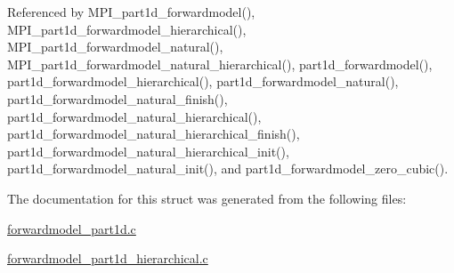 Referenced by M\+P\+I\+\_\+part1d\+\_\+forwardmodel(), M\+P\+I\+\_\+part1d\+\_\+forwardmodel\+\_\+hierarchical(), M\+P\+I\+\_\+part1d\+\_\+forwardmodel\+\_\+natural(), M\+P\+I\+\_\+part1d\+\_\+forwardmodel\+\_\+natural\+\_\+hierarchical(), part1d\+\_\+forwardmodel(), part1d\+\_\+forwardmodel\+\_\+hierarchical(), part1d\+\_\+forwardmodel\+\_\+natural(), part1d\+\_\+forwardmodel\+\_\+natural\+\_\+finish(), part1d\+\_\+forwardmodel\+\_\+natural\+\_\+hierarchical(), part1d\+\_\+forwardmodel\+\_\+natural\+\_\+hierarchical\+\_\+finish(), part1d\+\_\+forwardmodel\+\_\+natural\+\_\+hierarchical\+\_\+init(), part1d\+\_\+forwardmodel\+\_\+natural\+\_\+init(), and part1d\+\_\+forwardmodel\+\_\+zero\+\_\+cubic().



The documentation for this struct was generated from the following files\+:\begin{DoxyCompactItemize}
\item 
\hyperlink{forwardmodel__part1d_8c}{forwardmodel\+\_\+part1d.\+c}\item 
\hyperlink{forwardmodel__part1d__hierarchical_8c}{forwardmodel\+\_\+part1d\+\_\+hierarchical.\+c}\end{DoxyCompactItemize}
